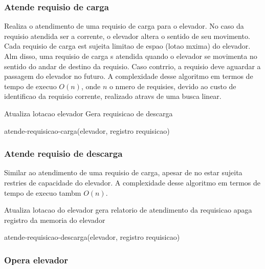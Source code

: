 \documentclass[12pt]{article}
\begin{document}
\subsubsection{Atende requisio de carga}

Realiza o atendimento de uma requisio de carga para o elevador. No caso da requisio atendida ser a corrente, o elevador altera o sentido de seu movimento. Cada requisio de carga est sujeita  limitao de espao (lotao mxima) do elevador. Alm disso, uma requisio de carga s  atendida quando o elevador se movimenta no sentido do andar de destino da requisio. Caso contrrio, a requisio deve aguardar a passagem do elevador no futuro. A complexidade desse algoritmo em termos de tempo de execuo  $O(n)$, onde $n$  o nmero de requisies, devido ao custo de identificao da requisio corrente, realizado atravs de uma busca linear.
\begin{algorithm}[h!]
\begin{footnotesize}


	Atualiza lotacao elevador\;
	Gera requisicao de descarga\;

\caption{atende-requisicao-carga(elevador, registro requisicao)}%
\end{footnotesize}
\end{algorithm}

\subsubsection{Atende requisio de descarga}

Similar ao atendimento de uma requisio de carga, apesar de no estar sujeita  restries de capacidade do elevador. A complexidade desse algoritmo em termos de tempo de execuo tambm  $O(n)$.
\begin{algorithm}[h!]
\begin{footnotesize}


	Atualiza lotacao do elevador\;
	gera relatorio de atendimento da requisicao\;
	apaga registro da memoria do elevador\;

\caption{atende-requisicao-descarga(elevador, registro requisicao)}%
\end{footnotesize}
\end{algorithm}


\subsubsection{Opera elevador}
\end{document}
